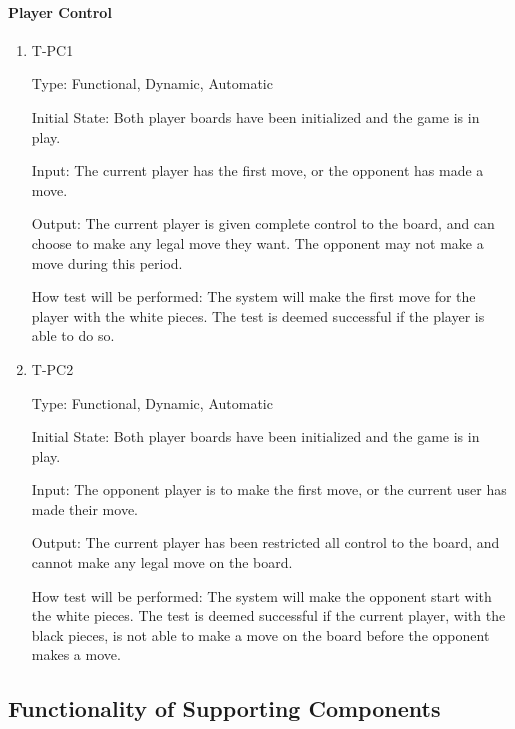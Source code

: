 \documentclass[12pt, titlepage]{article}
\begin{document}
    \paragraph{Player Control}
        \begin{enumerate}
        
            \item{T-PC1\\}
            
                Type: Functional, Dynamic, Automatic
                					
                Initial State: Both player boards have been initialized and the game is in play.
                					
                Input: The current player has the first move, or the opponent has made a move.
                					
                Output: The current player is given complete control to the board, and can choose to make any legal move they want. The opponent may not make a move during this period.
                					
                How test will be performed: The system will make the first move for the player with the white pieces. The test is deemed successful if the player is able to do so.

            \item{T-PC2\\}
            
                Type: Functional, Dynamic, Automatic
                					
                Initial State: Both player boards have been initialized and the game is in play.
                					
                Input: The opponent player is to make the first move, or the current user has made their move.
                					
                Output: The current player has been restricted all control to the board, and cannot make any legal move on the board.
                					
                How test will be performed: The system will make the opponent start with the white pieces. The test is deemed successful if the current player, with the black pieces, is not able to make a move on the board before the opponent makes a move.

        \end{enumerate}

\subsection{Functionality of Supporting Components}
\end{document}
